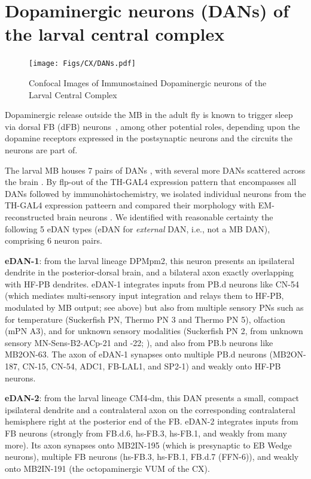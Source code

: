 \section{Dopaminergic neurons (DANs) of the larval central complex}
    
    \begin{figure}
        \centering
        \texttt{[image: Figs/CX/DANs.pdf]}
        \caption{Confocal Images of Immunostained Dopaminergic neurons of the Larval Central Complex}
        \label{DANs}
    \end{figure}

Dopaminergic release outside the MB in the adult fly is known to trigger sleep via dorsal FB (dFB) neurons~\citep{pimentel2016sleep}, among other potential roles, depending upon the dopamine receptors expressed in the postsynaptic neurons and the circuits the neurons are part of.

The larval MB houses 7 pairs of DANs \citep{eichler2017complete}, with several more DANs scattered across the brain \citep{selcho2009thgal4}. By flp-out of the TH-GAL4 expression pattern that encompasses all DANs \citep{selcho2009thgal4} followed by immunohistochemistry, we isolated individual neurons from the TH-GAL4 expression patteern and compared their morphology with EM-reconstructed brain neurons \citep{winding2023connectome}. We identified with reasonable certainty the following 5 eDAN types (eDAN for \textit{external} DAN, i.e., not a MB DAN), comprising 6 neuron pairs.

\textbf{eDAN-1}: from the larval lineage DPMpm2, this neuron presents an ipsilateral dendrite in the posterior-dorsal brain, and a bilateral axon exactly overlapping with HF-PB dendrites. eDAN-1 integrates inputs from PB.d neurons like CN-54 (which mediates multi-sensory input integration and relays them to HF-PB, modulated by MB output; see above) but also from multiple sensory PNs such as for temperature (Suckerfish PN, Thermo PN 3 and Thermo PN 5), olfaction (mPN A3), and for unknown sensory modalities (Suckerfish PN 2, from unknown sensory MN-Sens-B2-ACp-21 and -22; \citep{miroschnikow2018convergence}), and also from PB.b neurons like MB2ON-63. The axon of eDAN-1 synapses onto multiple PB.d neurons (MB2ON-187, CN-15, CN-54, ADC1, FB-LAL1, and SP2-1) and weakly onto HF-PB neurons.

\textbf{eDAN-2}: from the larval lineage CM4-dm, this DAN presents a small, compact ipsilateral dendrite and a contralateral axon on the corresponding contralateral hemisphere right at the posterior end of the FB. eDAN-2 integrates inputs from FB neurons (strongly from FB.d.6, hs-FB.3, hs-FB.1, and weakly from many more). Its axon synapses onto MB2IN-195 (which is presynaptic to EB Wedge neurons), multiple FB neurons (hs-FB.3, hs-FB.1, FB.d.7 (FFN-6)), and weakly onto MB2IN-191 (the octopaminergic VUM of the CX).

